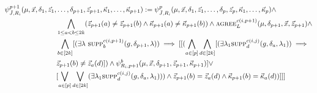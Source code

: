 \documentclass[../main/thesis.tex]{subfiles}
\begin{document}
\begin{align*}
  \psi^{p+1}_{\bar{J}, R_i} (\mu, \vec{x}, \delta_{1}, \vec{z}_1, &\ldots, \delta_{p+1}, \vec{z}_{p+1}, \vec{\kappa}_1, \ldots, \vec{\kappa}_{p+1}) :=  \psi^{p}_{\bar{J}, R_i} (\mu, \vec{x}, \delta_{1}, \vec{z}_1, \ldots, \delta_{p}, \vec{z}_{p}, \vec{\kappa}_1, \ldots, \vec{\kappa}_{p})  \land \\ &  \bigwedge_{1 \leq a < b \leq 2k}(\vec{z}_{p+1}(a) \neq \vec{z}_{p+1}(b) \land \vec{\kappa}_{p +1}(a) \neq \vec{\kappa}_{p +1} (b)) \land \textsc{agree}^{c(i, p+1)}_L(\mu, \delta_{p+1}, \vec{x}, \vec{z}_{p + 1})\land \\ & \bigwedge_{b \in [2k]} [(\exists \lambda \, \, \textsc{supp}^{c(i, p+1)}_b(g, \delta_{p+1}, \lambda)) \implies  [[(\bigwedge_{a \in [p]} \bigwedge_{d \in [2k]} [(\exists \lambda_1 \textsc{supp}^{c(i, j)}_d(g, \delta_{a}, \lambda_1)) \implies \\ & \vec{z}_{p+1}(b) \neq \vec{z}_{a}(d)]) \land \psi^b_{R_i, p+1}(\mu, \vec{x}, \delta_{p+1}, \vec{z}_{p+1}, \vec{\kappa}_{p+1})] \lor  \\ & [\bigvee_{a \in [p]} \bigvee_{d \in [2k]} (\exists \lambda_1 \textsc{supp}^{c(i, j)}_d(g, \delta_{a}, \lambda_1))) \land \vec{z}_{p+1}(b) = \vec{z}_{a}(d) \land \vec{\kappa}_{p+1}(b) = \vec{\kappa}_{a}(d))]]]
\end{align*}
\end{document}
